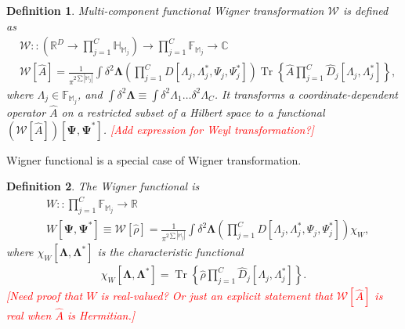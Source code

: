 \documentclass[12pt,aip,jmp,amssymb,amsmath]{revtex4-1}
\newcommand{\todo}[1]{\textcolor{red}{[#1]}}
\newcommand{\bLambda}{\boldsymbol{\Lambda}}
\newcommand{\bPsi}{\boldsymbol{\Psi}}
\newcommand{\Trace}[1]{\operatorname{Tr} \left\{ #1 \right\}}
\newcommand{\restbasis}{\mathbb{M}}
\newtheorem{definition}{Definition}
\begin{document}
\begin{definition}
\label{def:func-wigner:w-transformation}
    Multi-component functional Wigner transformation $\mathcal{W}$ is defined as
    \begin{equation*}\begin{split}
    &    \mathcal{W} :: \left( \mathbb{R}^D \rightarrow \prod_{j=1}^C \mathbb{H}_{\restbasis_j} \right)
            \rightarrow \prod_{j=1}^C \mathbb{F}_{\restbasis_j}
            \rightarrow \mathbb{C} \\
    &    \mathcal{W}[\hat{A}]
        = \frac{1}{\pi^{2 \sum|\restbasis_j|}} \int \delta^2 \bLambda
            \left( \prod_{j=1}^C D[\Lambda_j, \Lambda_j^*, \Psi_j, \Psi_j^*] \right)
            \Trace{ \hat{A} \prod_{j=1}^C \hat{D}_j[\Lambda_j, \Lambda_j^*] },
    \end{split}\end{equation*}
    where $\Lambda_j \in \mathbb{F}_{\restbasis_j}$, and $\int \delta^2 \bLambda \equiv \int \delta^2 \Lambda_1 \ldots \delta^2 \Lambda_C$.
    It transforms a coordinate-dependent operator $\hat{A}$ on a restricted subset of a Hilbert space to a functional $(\mathcal{W}[\hat{A}])[\bPsi, \bPsi^*]$.
    \todo{Add expression for Weyl transformation?}
\end{definition}

Wigner functional is a special case of Wigner transformation.

\begin{definition}
\label{def:func-wigner:w-functional}
    The Wigner functional is
    \begin{equation*}\begin{split}
    &    W :: \prod_{j=1}^C \mathbb{F}_{\restbasis_j} \rightarrow \mathbb{R} \\
    &    W [\bPsi, \bPsi^*]
        \equiv \mathcal{W}[\hat{\rho}]
        = \frac{1}{\pi^{2 \sum|\restbasis_j|}} \int \delta^2 \bLambda
            \left( \prod_{j=1}^C D[\Lambda_j, \Lambda_j^*, \Psi_j, \Psi_j^*] \right) \chi_W,
    \end{split}\end{equation*}
    where $\chi_W [\bLambda, \bLambda^*]$ is the characteristic functional
    \begin{equation*}\begin{split}
        \chi_W [\bLambda, \bLambda^*]
        = \Trace{ \hat{\rho} \prod_{j=1}^C \hat{D}_j[\Lambda_j, \Lambda_j^*] }.
    \end{split}\end{equation*}
    \todo{Need proof that $W$ is real-valued?
    Or just an explicit statement that $\mathcal{W}[\hat{A}]$ is real when $\hat{A}$ is Hermitian.}
\end{definition}
\end{document}
